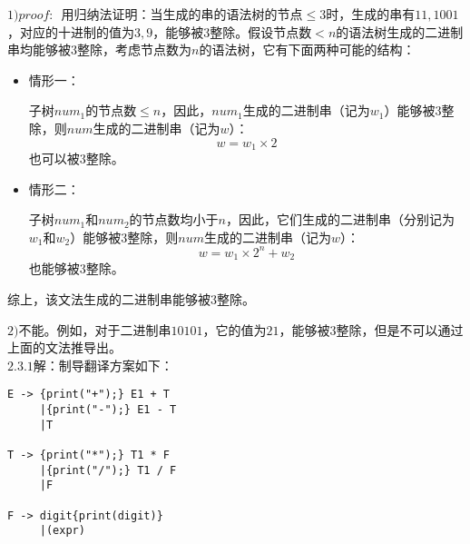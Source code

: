 \documentclass[UTF8,noindent]{ctexart}
\begin{document}
$1)proof:$\ 用归纳法证明：当生成的串的语法树的节点$\le 3$时，生成的串有$11, 1001$，对应的十进制的值为$3, 9$，能够被$3$整除。假设节点数$<n$的语法树生成的二进制串均能够被$3$整除，考虑节点数为$n$的语法树，它有下面两种可能的结构：
\begin{itemize}
  \item 情形一：
	\begin{figure}[H]
	  \centering
	\end{figure}
  子树$num_1$的节点数$\le n$，因此，$num_1$生成的二进制串（记为$w_1$）能够被$3$整除，则$num$生成的二进制串（记为$w$）：
  \[w=w_1 \times 2 \]
  也可以被$3$整除。
  \item 情形二：
	\begin{figure}[H]
	  \centering
	\end{figure}
	子树$num_1$和$num_2$的节点数均小于$n$，因此，它们生成的二进制串（分别记为$w_1$和$w_2$）能够被$3$整除，则$num$生成的二进制串（记为$w$）：
	\[w = w_1\times 2^n + w_2\]
	也能够被$3$整除。
\end{itemize}
综上，该文法生成的二进制串能够被$3$整除。

$2)$不能。例如，对于二进制串$10101$，它的值为$21$，能够被$3$整除，但是不可以通过上面的文法推导出。\\

$2.3.1$解：制导翻译方案如下：
\begin{lstlisting}
E -> {print("+");} E1 + T
     |{print("-");} E1 - T
     |T

T -> {print("*");} T1 * F
     |{print("/");} T1 / F
     |F

F -> digit{print(digit)}
     |(expr)
\end{lstlisting}
\end{document}
